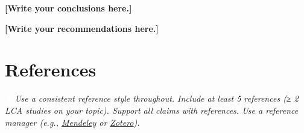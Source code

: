 \documentclass[10pt]{article}
\newcommand{\placeholder}[1]{\textcolor{lcaph}{\textbf{#1}}}    %
\newcommand{\infoicon}{{\setlength{\fboxsep}{1pt}\colorbox{lcablue}{\textcolor{white}{\upshape\bfseries\,i\,}}}}
\newcommand{\guidance}[1]{\par\noindent\colorbox{lcabox}{\parbox{\dimexpr\linewidth-2\fboxsep}{\setlength{\parskip}{2pt}\small\itshape\infoicon\ \color{lcatext}#1}}\par}
\begin{document}
\placeholder{[Write your conclusions here.]}

\placeholder{[Write your recommendations here.]}

\newpage
\section{References}
\guidance{Use a consistent reference style throughout. Include at least 5 references (≥ 2 LCA studies on your topic). Support all claims with references. Use a reference manager (e.g., \href{https://brightspace.universiteitleiden.nl/d2l/le/lessons/27150/topics/361360}{Mendeley} or \href{https://brightspace.universiteitleiden.nl/d2l/le/lessons/27150/topics/1980501}{Zotero}).}

\printbibliography[heading=none]

\newpage
\end{document}

